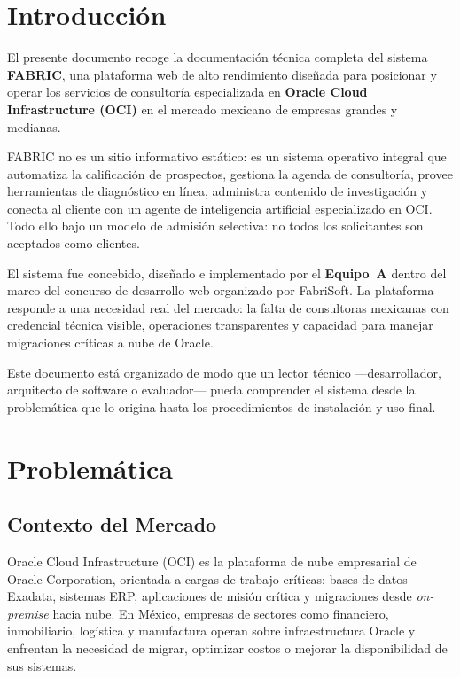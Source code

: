 \documentclass[12pt, a4paper, twoside]{report}
\begin{document}
\clearpage
\chapter*{Introducción}

El presente documento recoge la documentación técnica completa del sistema \textbf{FABRIC},
una plataforma web de alto rendimiento diseñada para posicionar y operar los servicios de
consultoría especializada en \textbf{Oracle Cloud Infrastructure (OCI)} en el mercado mexicano
de empresas grandes y medianas.

FABRIC no es un sitio informativo estático: es un sistema operativo integral que automatiza
la calificación de prospectos, gestiona la agenda de consultoría, provee herramientas de
diagnóstico en línea, administra contenido de investigación y conecta al cliente con un agente
de inteligencia artificial especializado en OCI. Todo ello bajo un modelo de admisión selectiva:
no todos los solicitantes son aceptados como clientes.

El sistema fue concebido, diseñado e implementado por el \textbf{Equipo~A} dentro del marco
del concurso de desarrollo web organizado por FabriSoft. La plataforma responde a una necesidad
real del mercado: la falta de consultoras mexicanas con credencial técnica visible, operaciones
transparentes y capacidad para manejar migraciones críticas a nube de Oracle.

Este documento está organizado de modo que un lector técnico ---desarrollador, arquitecto de
software o evaluador--- pueda comprender el sistema desde la problemática que lo origina hasta
los procedimientos de instalación y uso final.

\clearpage
\chapter{Problemática}

\section{Contexto del Mercado}

Oracle Cloud Infrastructure (OCI) es la plataforma de nube empresarial de Oracle Corporation,
orientada a cargas de trabajo críticas: bases de datos Exadata, sistemas ERP, aplicaciones de
misión crítica y migraciones desde \textit{on-premise} hacia nube. En México, empresas de
sectores como financiero, inmobiliario, logística y manufactura operan sobre infraestructura
Oracle y enfrentan la necesidad de migrar, optimizar costos o mejorar la disponibilidad de
sus sistemas.
\end{document}
